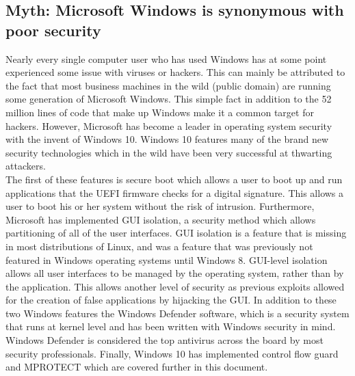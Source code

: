 \documentclass{article}
\newcommand\tab[1][1cm]{\hspace*{#1}}
\begin{document}
\subsection{Myth: Microsoft Windows is synonymous with poor security}
\tab Nearly every single computer user who has used Windows has at some point experienced some issue with viruses or hackers. This can mainly be attributed to the fact that most business machines in the wild (public domain) are running some generation of Microsoft Windows. This simple fact in addition to the 52 million lines of code that make up Windows make it a common target for hackers. However, Microsoft has become a leader in operating system security with the invent of Windows 10. Windows 10 features many of the brand new security technologies which in the wild have been very successful at thwarting attackers. 
\\
\tab The first of these features is secure boot which allows a user to boot up and run applications that the UEFI firmware checks for a digital signature. This allows a user to boot his or her system without the risk of intrusion. Furthermore, Microsoft has implemented GUI isolation, a security method which allows partitioning of all of the user interfaces. GUI isolation is a feature that is missing in most distributions of Linux, and was a feature that was previously not featured in Windows operating systems until Windows 8. GUI-level isolation allows all user interfaces to be managed by the operating system, rather than by the application. This allows another level of security as previous exploits allowed for the creation of false applications by hijacking the GUI. In addition to these two Windows features the Windows Defender software, which is a security system that runs at kernel level and has been written with Windows security in mind. Windows Defender is considered the top antivirus across the board by most security professionals. Finally, Windows 10 has implemented control flow guard and MPROTECT which are covered further in this document.
\\
\end{document}
